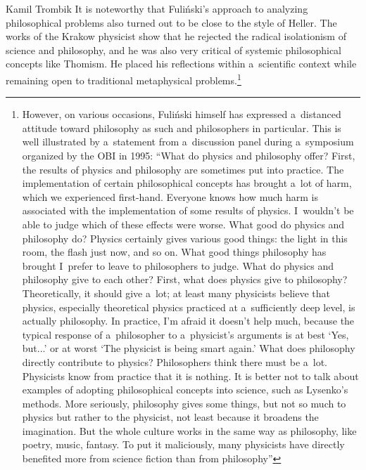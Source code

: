 \begin{artengenv}{Kamil Trombik}
It is noteworthy that Fuliński's approach to analyzing philosophical problems also turned out to be close to the style of Heller. The works of the Krakow physicist show that he rejected the radical isolationism of science and philosophy, and he was also very critical of systemic philosophical concepts like Thomism. He placed his reflections within a~scientific context while remaining open to traditional metaphysical problems.\footnote{However, on various occasions, Fuliński himself has expressed a~distanced attitude toward philosophy as such and philosophers in particular. This is well illustrated by a~statement from a~discussion panel during a~symposium organized by the OBI in 1995: ``What do physics and philosophy offer? First, the results of physics and philosophy are sometimes put into practice. The implementation of certain philosophical concepts has brought a~lot of harm, which we experienced first-hand. Everyone knows how much harm is associated with the implementation of some results of physics. I~wouldn't be able to judge which of these effects were worse. What good do physics and philosophy do? Physics certainly gives various good things: the light in this room, the flash just now, and so on. What good things philosophy has brought I~prefer to leave to philosophers to judge. What do physics and philosophy give to each other? First, what does physics give to philosophy? Theoretically, it should give a~lot; at least many physicists believe that physics, especially theoretical physics practiced at a~sufficiently deep level, is actually philosophy. In practice, I'm afraid it doesn't help much, because the typical response of a~philosopher to a~physicist's arguments is at best ‘Yes, but...' or at worst ‘The physicist is being smart again.' What does philosophy directly contribute to physics? Philosophers think there must be a~lot. Physicists know from practice that it is nothing. It is better not to talk about examples of adopting philosophical concepts into science, such as Lysenko's methods. More seriously, philosophy gives some things, but not so much to physics but rather to the physicist, not least because it broadens the imagination. But the whole culture works in the same way as philosophy, like poetry, music, fantasy. To put it maliciously, many physicists have directly benefited more from science fiction than from philosophy''
}
\end{artengenv}

